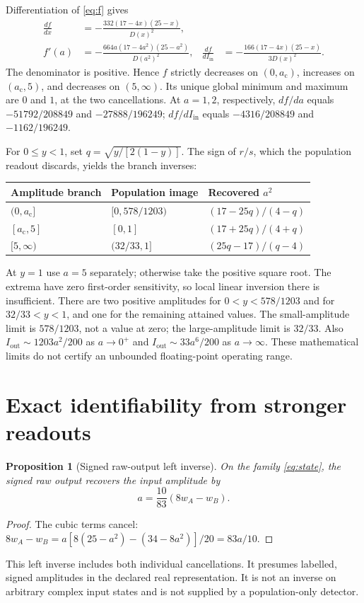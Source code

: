 \documentclass[11pt,a4paper]{article}
\newtheorem{proposition}{Proposition}
\newcommand{\Iout}{I_{\mathrm{out}}}
\newcommand{\Iin}{I_{\mathrm{in}}}
\newcommand{\ac}{a_{\mathrm c}}
\begin{document}
Differentiation of \eqref{eq:f} gives
\begin{align}
\frac{df}{dx}&=-\frac{332(17-4x)(25-x)}{D(x)^2},\label{eq:dx}\\
f'(a)&=-\frac{664a(17-4a^2)(25-a^2)}{D(a^2)^2},&
\frac{df}{d\Iin}&=-\frac{166(17-4x)(25-x)}{3D(x)^2}.\label{eq:sensitivity}
\end{align}
The denominator is positive. Hence $f$ strictly decreases on $(0,\ac)$, increases on $(\ac,5)$, and decreases on $(5,\infty)$. Its unique global minimum and maximum are $0$ and $1$, at the two cancellations. At $a=1,2$, respectively, $df/da$ equals $-51792/208849$ and $-27888/196249$; $df/d\Iin$ equals $-4316/208849$ and $-1162/196249$.

For $0\le y<1$, set $q=\sqrt{y/[2(1-y)]}$. The sign of $r/s$, which the population readout discards, yields the branch inverses:
\begin{center}
\begin{tabular}{@{}lll@{}}
\toprule
Amplitude branch & Population image & Recovered $a^2$\\\midrule
$(0,\ac]$ & $[0,578/1203)$ & $(17-25q)/(4-q)$\\[3pt]
$[\ac,5]$ & $[0,1]$ & $(17+25q)/(4+q)$\\[3pt]
$[5,\infty)$ & $(32/33,1]$ & $(25q-17)/(q-4)$\\\bottomrule
\end{tabular}
\end{center}
At $y=1$ use $a=5$ separately; otherwise take the positive square root. The extrema have zero first-order sensitivity, so local linear inversion there is insufficient. There are two positive amplitudes for $0<y<578/1203$ and for $32/33<y<1$, and one for the remaining attained values. The small-amplitude limit is $578/1203$, not a value at zero; the large-amplitude limit is $32/33$. Also $\Iout\sim1203a^2/200$ as $a\to0^+$ and $\Iout\sim33a^6/200$ as $a\to\infty$. These mathematical limits do not certify an unbounded floating-point operating range.

\clearpage
\section{Exact identifiability from stronger readouts}\label{sec:inverse}
\begin{proposition}[Signed raw-output left inverse]\label{prop:raw}
On the family \eqref{eq:state}, the signed raw output recovers the input amplitude by
\begin{equation}
\boxed{a=\frac{10}{83}(8w_A-w_B)}.\label{eq:rawinverse}
\end{equation}
\end{proposition}
\begin{proof}
The cubic terms cancel:
$8w_A-w_B=a[8(25-a^2)-(34-8a^2)]/20=83a/10$.
\end{proof}
This left inverse includes both individual cancellations. It presumes labelled, signed amplitudes in the declared real representation. It is not an inverse on arbitrary complex input states and is not supplied by a population-only detector.
\end{document}
